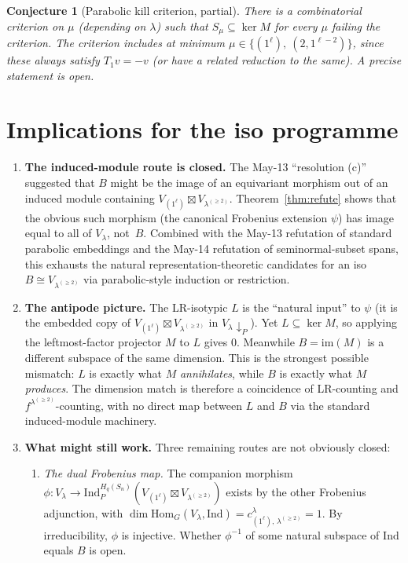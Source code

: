 \documentclass[11pt]{article}
\newtheorem{conjecture}[theorem]{Conjecture}
\theoremstyle{definition}
\begin{document}
\begin{conjecture}[Parabolic kill criterion, partial]\label{conj:para}
There is a combinatorial criterion on $\mu$ (depending on $\lambda$)
such that $S_\mu \subseteq \ker M$ for every $\mu$ failing the
criterion. The criterion includes at minimum
$\mu \in \{(1^\ell),\ (2, 1^{\ell-2})\}$, since these always satisfy
$T_1 v = -v$ (or have a related reduction to the same). A precise
statement is open.
\end{conjecture}

\section{Implications for the iso programme}\label{sec:implications}

\begin{enumerate}[leftmargin=2em,topsep=0.3em,itemsep=0.3em]
\item \textbf{The induced-module route is closed.} The May-13
``resolution (c)'' suggested that $B$ might be the image of an
equivariant morphism out of an induced module containing
$V_{(1^\ell)} \boxtimes V_{\lambda^{(\ge 2)}}$. Theorem~\ref{thm:refute}
shows that the obvious such morphism (the canonical Frobenius
extension $\psi$) has image equal to all of $V_\lambda$, not~$B$.
Combined with the May-13 refutation of standard parabolic embeddings
and the May-14 refutation of seminormal-subset spans, this exhausts
the natural representation-theoretic candidates for an iso
$B \cong V_{\lambda^{(\ge 2)}}$ via parabolic-style induction or
restriction.

\item \textbf{The antipode picture.} The LR-isotypic $L$ is the
``natural input'' to $\psi$ (it is the embedded copy of
$V_{(1^\ell)} \boxtimes V_{\lambda^{(\ge 2)}}$ in $V_\lambda \!\downarrow_P$).
Yet $L \subseteq \ker M$, so applying the leftmost-factor projector
$M$ to $L$ gives $0$. Meanwhile $B = \mathrm{im}(M)$ is a different
subspace of the same dimension. This is the strongest possible
mismatch: $L$ is exactly what $M$ \emph{annihilates}, while $B$ is
exactly what $M$ \emph{produces}. The dimension match is therefore
a coincidence of LR-counting and $f^{\lambda^{(\ge 2)}}$-counting,
with no direct map between $L$ and $B$ via the standard induced-module
machinery.

\item \textbf{What might still work.} Three remaining routes are not
obviously closed:
\begin{enumerate}[label=(\roman*),topsep=0.2em,itemsep=0.1em]
\item \emph{The dual Frobenius map.} The companion morphism
$\phi : V_\lambda \to \mathrm{Ind}_P^{H_q(S_n)}(V_{(1^\ell)}
\boxtimes V_{\lambda^{(\ge 2)}})$ exists by the other Frobenius
adjunction, with $\dim \mathrm{Hom}_G(V_\lambda, \mathrm{Ind}) = c^\lambda_{(1^\ell),\,\lambda^{(\ge 2)}} = 1$.
By irreducibility, $\phi$ is injective. Whether $\phi^{-1}$ of some
natural subspace of $\mathrm{Ind}$ equals $B$ is open.


\end{enumerate}
\end{enumerate}
\end{document}
